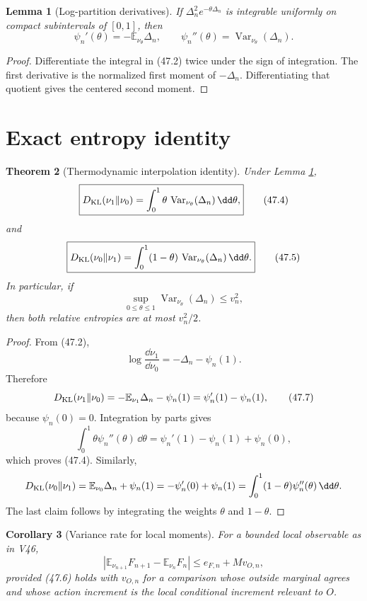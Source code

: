 \documentclass[11pt]{article}
\newtheorem{theorem}{Theorem}[section]
\newtheorem{lemma}[theorem]{Lemma}
\newtheorem{corollary}[theorem]{Corollary}
\theoremstyle{remark}
\begin{document}
\begin{lemma}[Log-partition derivatives]
\label{lem:v15v47-logpartition}
If \(\Delta_n^2e^{-\theta\Delta_n}\) is integrable uniformly on
compact subintervals of \([0,1]\), then
\[
 \psi_n'(\theta)=-\mathbb E_{\nu_\theta}\Delta_n,\qquad
 \psi_n''(\theta)=
 \operatorname{Var}_{\nu_\theta}(\Delta_n).             \tag{47.3}
\]
\end{lemma}

\begin{proof}
Differentiate the integral in (47.2) twice under the sign of
integration.  The first derivative is the normalized first moment
of \(-\Delta_n\).  Differentiating that quotient gives the centered
second moment.
\end{proof}

\section{Exact entropy identity}

\begin{theorem}[Thermodynamic interpolation identity]
\label{thm:v15v47-entropy-identity}
Under Lemma \ref{lem:v15v47-logpartition},
\[
 \boxed{
 D_{\rm KL}(\nu_1\Vert\nu_0)
 =
 \int_0^1\theta\,
 \operatorname{Var}_{\nu_\theta}(\Delta_n)\,\dd\theta,} \tag{47.4}
\]
and
\[
 \boxed{
 D_{\rm KL}(\nu_0\Vert\nu_1)
 =
 \int_0^1(1-\theta)\,
 \operatorname{Var}_{\nu_\theta}(\Delta_n)\,\dd\theta.} \tag{47.5}
\]
In particular, if
\[
 \sup_{0\leq\theta\leq1}
 \operatorname{Var}_{\nu_\theta}(\Delta_n)\leq v_n^2,   \tag{47.6}
\]
then both relative entropies are at most \(v_n^2/2\).
\end{theorem}

\begin{proof}
From (47.2),
\[
 \log\frac{\dd\nu_1}{\dd\nu_0}
 =-\Delta_n-\psi_n(1).
\]
Therefore
\[
 D_{\rm KL}(\nu_1\Vert\nu_0)
 =-\mathbb E_{\nu_1}\Delta_n-\psi_n(1)
 =\psi_n'(1)-\psi_n(1),                                 \tag{47.7}
\]
because \(\psi_n(0)=0\).  Integration by parts gives
\[
 \int_0^1\theta\psi_n''(\theta)\,\dd\theta
 =\psi_n'(1)-\psi_n(1)+\psi_n(0),
\]
which proves (47.4).  Similarly,
\[
 D_{\rm KL}(\nu_0\Vert\nu_1)
 =\mathbb E_{\nu_0}\Delta_n+\psi_n(1)
 =-\psi_n'(0)+\psi_n(1)
 =\int_0^1(1-\theta)\psi_n''(\theta)\,\dd\theta.
\]
The last claim follows by integrating the weights \(\theta\) and
\(1-\theta\).
\end{proof}

\begin{corollary}[Variance rate for local moments]
\label{cor:v15v47-moment-rate}
For a bounded local observable as in V46,
\[
 \left|\mathbb E_{\nu_{n+1}}F_{n+1}
 -\mathbb E_{\nu_n}F_n\right|
 \leq e_{F,n}+Mv_{O,n},                                 \tag{47.8}
\]
provided (47.6) holds with \(v_{O,n}\) for a comparison whose
outside marginal agrees and whose action increment is the local
conditional increment relevant to \(O\).
\end{corollary}
\end{document}
